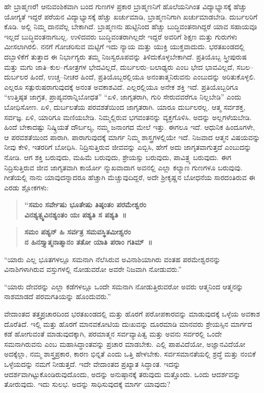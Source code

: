 ಹೇ ಬ್ರಾಹ್ಮಣರೆ! ಆನುವಂಶಿಕವಾಗಿ ಬಂದ ಗುಣಗಳ ಪ್ರಕಾರ ಬ್ರಾಹ್ಮಣನಿಗೆ ಹೊಲೆಯನಿಗಿಂತ ವಿದ್ಯಾಭ್ಯಾಸಕ್ಕೆ ಹೆಚ್ಚು ಯೋಗ್ಯತೆ ಇದ್ದರೆ ಪರೆಯನ ವಿದ್ಯಾಭ್ಯಾಸಕ್ಕೆ ಹೆಚ್ಚು ಖರ್ಚುಮಾಡಿ, ಬ್ರಾಹ್ಮಣನಿಗಾಗಿ ಖರ್ಚುಮಾಡಬೇಡಿ. ದುರ್ಬಲರಿಗೆ ಕೊಡಿ. ಅಲ್ಲಿ ನಿಮ್ಮ ದಾನವೆಲ್ಲ ಬೇಕಾಗಿದೆ. ಬ್ರಾಹ್ಮಣನು ಹುಟ್ಟಿನಿಂದ ಹೆಚ್ಚು ಬುದ್ಧಿವಂತನಾಗಿದ್ದರೆ ಯಾವ ಸಹಾಯವೂ ಇಲ್ಲದೆ ಬುದ್ಧಿವಂತನಾಗಬಲ್ಲ. ಉಳಿದವರು ಬುದ್ಧಿವಂತರಾಗಿಲ್ಲದೇ ಇದ್ದರೆ ಅವರಿಗೆ ಶಿಕ್ಷಣ ಮತ್ತು ಗುರುಗಳು ಮೀಸ\-ಲಾಗಿರಲಿ. ನನಗೆ ಗೋಚರಿಸುವ ಮಟ್ಟಿಗೆ ಇದು ನ್ಯಾಯ ಮತ್ತು ಯುಕ್ತಿ ಯುಕ್ತವಾದುದು. ಭರತಖಂಡದಲ್ಲಿ ದಬ್ಬಾಳಿಕೆಗೆ ತುತ್ತಾದ ಈ ನಿರ್ಭಾಗ್ಯರು ತಮ್ಮ ನಿಜಸ್ವರೂಪವನ್ನು ತಿಳಿದುಕೊಳ್ಳಬೇಕಾಗಿದೆ. ಪ್ರತಿಯೊಬ್ಬ ಸ್ತ್ರೀಪುರುಷ ಮತ್ತು ಮಗು ಜಾತಿ–ಕುಲ–ಗೋತ್ರಗಳ ಭೇದವಿಲ್ಲದೆ, ದುರ್ಬಲರು–ಬಲಾಢ್ಯರು ಎಂಬ ಭೇದ ಭಾವವಿಲ್ಲದೆ, ಸಬಲ–ದುರ್ಬಲರ ಹಿಂದೆ, ಉಚ್ಚ–ನೀಚರ ಹಿಂದೆ, ಪ್ರತಿಯೊಬ್ಬರಲ್ಲಿಯೂ ಅನಂತಾತ್ಮನಿರುವನು ಎಂಬುದನ್ನು ಅರಿತುಕೊಳ್ಳಲಿ. ಎಲ್ಲರೂ ಸತ್ಪುರುಷರಾಗುವುದಕ್ಕೆ ಅನಂತ ಅವಕಾಶವಿದೆ. ಎಲ್ಲರಲ್ಲಿಯೂ ಅನೇಕ ಶಕ್ತಿ ಇದೆ. ಪ್ರತಿಯೊಬ್ಬರಿಗೂ “ಉತ್ತಿಷ್ಠತ ಜಾಗ್ರತ, ಪ್ರಾಪ್ಯವರಾನ್ನಿಬೋಧತ” “ಏಳಿ, ಜಾಗೃತರಾಗಿ, ಗುರಿ ಸೇರುವವರೆಗೂ ನಿಲ್ಲಬೇಡಿ” ಎಂದು ಬೋಧಿಸೋಣ. ಏಳಿ, ದುರ್ಬಲತೆಯ ಪರವಶತೆಯಿಂದ ಜಾಗೃತರಾಗಿ. ಯಾರೂ ದುರ್ಬಲರಲ್ಲ. ಆತ್ಮ ಸರ್ವಶಕ್ತ, ಸರ್ವಜ್ಞ. ಏಳಿ, ಯಾರಿಗೂ ಮಣಿಯಬೇಡಿ. ನಿಮ್ಮಲ್ಲಿರುವ ಭಗವಂತನನ್ನು ವ್ಯಕ್ತಗೊಳಿಸಿ. ಅದನ್ನು ಅಲ್ಲಗಳೆಯಬೇಡಿ. ಹಿಂದೆ ಬೇಕಾದಷ್ಟು ನಿಷ್ಕ್ರಿಯತೆ ದೌರ್ಬಲ್ಯ, ನಮ್ಮ ಜನಾಂಗದ ಮೇಲೆ ಇತ್ತು. ಈಗಲೂ ಇದೆ. ಆಧುನಿಕ ಹಿಂದೂಗಳೇ, ಆ ಪರವಶತೆಯಿಂದ ಪಾರಾಗಿ. ಪಾರಾಗುವುದಕ್ಕೆ ಮಾರ್ಗ ನಿಮ್ಮ ಶಾಸ್ತ್ರಗಳಲ್ಲಿಯೇ ಇದೆ. ನಿಜವಾದ ಆತ್ಮನ ವಿಷಯವನ್ನು ನೀವು ಕೇಳಿ, ಇತರರಿಗೆ ಬೋಧಿಸಿ. ನಿದ್ರಿಸುತ್ತಿರುವ ಜೀವವನ್ನು ಎಬ್ಬಿಸಿ, ಹೇಗೆ ಅದು ಜಾಗೃತವಾಗುತ್ತದೆ ಎಂಬುದನ್ನು ನೋಡಿ. ಆಗ ಶಕ್ತಿ ಬರುವುದು, ಮಹಿಮೆ ಬರುವುದು, ಶ್ರೇಯಸ್ಸು ಬರುವುದು, ಪಾವಿತ್ರ್ಯ ಬರುವುದು. ಈಗ ನಿದ್ರಿಸುತ್ತಿರುವ ಜೀವ ಜಾಗೃತವಾಗಿ ಕಾರ್ಯೋ ನ್ಮುಖವಾದಾಗ ಅವನಲ್ಲಿ ಎಲ್ಲಾ ಕಲ್ಯಾಣ ಗುಣಗಳೂ ಬರುವುವು. ಗೀತೆಯಲ್ಲಿ ನಾನು ಯಾವುದನ್ನಾದರೂ ಹೆಚ್ಚಾಗಿ ಮೆಚ್ಚುವುದಿದ್ದರೆ, ಅದೇ ಶ‍್ರೀಕೃಷ್ಣನ ಬೋಧನೆಯ ಸಾರದಂತಿರುವ ಈ ಎರಡು ಶ್ಲೋಕಗಳು:

\begin{verse}
\textbf{“ಸಮಂ ಸರ್ವೇಷು ಭೂತೇಷು ತಿಷ್ಠಂತಂ ಪರಮೇಶ್ವರಂ}\\\textbf{ವಿನಶ್ಯತ್ಸ್ವವಿನಶ್ಯಂತಂ ಯಃ ಪಶ್ಯತಿ ಸ ಪಶ್ಯತಿ~॥} 
\end{verse}

\begin{verse}
\textbf{ಸಮಂ ಪಶ್ಯನ್​ ಹಿ ಸರ್ವತ್ರ ಸಮವಸ್ಥಿತಮೀಶ್ವರಂ}\\\textbf{ನ ಹಿನಸ್ತ್ಯಾತ್ಮನಾತ್ಮಾನಂ ತತೋ ಯಾತಿ ಪರಾಂ ಗತಿಮ್​~॥}
\end{verse}

“ಯಾರು ಎಲ್ಲ ಭೂತಗಳಲ್ಲೂ ಸಮನಾಗಿ ನೆಲೆಸಿರುವ ಅವಿನಾಶಿಯಾಗಿರು ವಂತಹ ಪರಮೇಶ್ವರನನ್ನು ವಿನಾಶಿಗಳಾಗಿರುವ ವಸ್ತುಗಳಲ್ಲಿ ನೋಡುವರೋ ಅವರೇ ನಿಜವಾಗಿ ನೋಡುವರು.”

“ಯಾರು ದೇವರನ್ನು ಎಲ್ಲಾ ಕಡೆಗಳಲ್ಲೂ ಒಂದೇ ಸಮನಾಗಿ ನೋಡುತ್ತಿರುವರೋ ಅವರು ಆತ್ಮನಿಂದ ಆತ್ಮನನ್ನು ನಾಶಮಾಡದೆ ಪರಮಗತಿಯನ್ನು ಹೊಂದುವರು.”

ವೇದಾಂತದ ತತ್ತ್ವಪ್ರಚಾರದಿಂದ ಭರತಖಂಡದಲ್ಲಿ ಮತ್ತು ಹೊರಗೆ ಪರೋಪಕಾರವನ್ನು ಮಾಡುವುದಕ್ಕೆ ಒಳ್ಳೆಯ ಅವಕಾಶ ದೊರೆತಿದೆ. ಇಲ್ಲಿ ಮತ್ತು ಹೊರಗೆ ಮಾನವಕೋಟಿಯ ದುಃಖವನ್ನು ದೂರಮಾಡಿ ಮಾನವರು ಶ್ರೇಯಸ್ಸಿನ ಮಾರ್ಗದ ಕಡೆ ಹೋಗುವಂತೆ ಮಾಡುವುದಕ್ಕಾಗಿ, ಪರಮಾತ್ಮನ ಸರ್ವವ್ಯಾಪಿತ್ವ ಮತ್ತು ಅವನು ಸರ್ವರಲ್ಲಿ ಒಂದೇ ಸಮನಾಗಿರುವನು ಎಂಬ ಮಹಾಸಿದ್ಧಾಂತವನ್ನು ಪ್ರಚಾರ ಮಾಡಬೇಕು. ಎಲ್ಲಿ ಪಾಪವಿದೆಯೋ, ಅಜ್ಞಾನವಿದೆಯೋ ಅದಕ್ಕೆಲ್ಲಾ, ನಮ್ಮ ಶಾಸ್ತ್ರ\-ಪ್ರಕಾರ, ಕಾರಣ ಭಿನ್ನತೆ ಎಂದು ಒತ್ತಿ ಹೇಳಬೇಕು. ಸರ್ವಸಮಾನತೆಯಲ್ಲಿ ಶ್ರದ್ಧೆ ಮತ್ತು ನಂಬಿಕೆ ಒಳ್ಳೆಯದನ್ನು ನಮಗೆ ನೀಡುತ್ತದೆ. ಇದೇ ವೇದಾಂತದ ಪ್ರಖ್ಯಾತ ಸಿದ್ಧಾಂತ. ಇದನ್ನು ಆದರ್ಶವಾಗಿಟ್ಟುಕೊಂಡಿರುವುದೊಂದು, ಅದನ್ನು ಅನುಷ್ಠಾನಕ್ಕೆ ತರುವುದು ಮತ್ತೊಂದು. ಒಂದು ಆದರ್ಶವನ್ನು ತೋರುವುದು. ಇದು ಸುಲಭ. ಅದನ್ನು ಸಾಧಿಸುವುದಕ್ಕೆ ಮಾರ್ಗ ಯಾವುದು?

